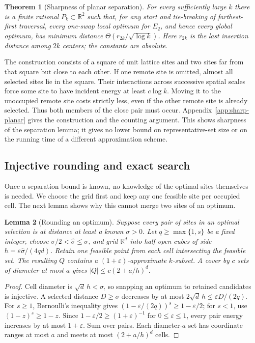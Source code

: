 \documentclass[a4paper,12pt]{article}
\newcommand{\R}{\mathbb R}
\newtheorem{theorem}{Theorem}[section]
\newtheorem{lemma}[theorem]{Lemma}
\numberwithin{equation}{section}
\begin{document}
\begin{theorem}[Sharpness of planar separation]\label{thm:sharp-planar}
For every sufficiently large $k$ there is a finite rational $P_k\subset\mathbb R^2$ such that,
for any start and tie-breaking of farthest-first traversal, every one-swap local optimum
for $E_2$, and hence every global optimum, has minimum distance
$\Theta(r_{2k}/\sqrt{\log k})$. Here $r_{2k}$ is the last insertion distance among $2k$ centers;
the constants are absolute.
\end{theorem}
The construction consists of a square of unit lattice sites and two sites far from that square
but close to each other. If one remote site is omitted, almost all selected sites lie in the
square. Their interactions across successive spatial scales force some site to have incident
energy at least $c\log k$. Moving it to the unoccupied remote site costs strictly less, even
if the other remote site is already selected. Thus both members of the close pair must occur.
Appendix~\ref{app:sharp-planar} gives the construction and the counting argument.
This shows sharpness of the separation lemma; it gives no lower bound on representative-set
size or on the running time of a different approximation scheme.

\subsection{Injective rounding and exact search}
Once a separation bound is known, no knowledge of the optimal sites themselves
is needed. We choose the grid first and keep any one feasible site per occupied
cell. The next lemma shows why this cannot merge two sites of an optimum.
\begin{lemma}[Rounding an optimum]\label{lem:rounding}
Suppose every pair of sites in an optimal selection is at distance at least a known $\sigma>0$. Let $q\ge\max\{1,s\}$
be a fixed integer, choose $\sigma/2<\widehat\sigma\le\sigma$, and grid $\R^d$ into half-open
cubes of side $h=\varepsilon\widehat\sigma/(4qd)$. Retain one feasible point from each cell
intersecting the feasible set. The resulting $Q$ contains a $(1+\varepsilon)$-approximate
$k$-subset. A cover by $c$ sets of diameter at most $a$ gives $|Q|\le c(2+a/h)^d$.
\end{lemma}
\begin{proof}
Cell diameter is $\sqrt d\,h<\sigma$, so snapping an optimum to retained candidates is injective.
A selected distance $D\ge\sigma$ decreases by at most $2\sqrt d\,h\le\varepsilon D/(2q)$. For
$s\ge1$, Bernoulli's inequality gives $(1-\varepsilon/(2q))^s\ge1-\varepsilon/2$; for $s<1$, use
$(1-z)^s\ge1-z$. Since $1-\varepsilon/2\ge(1+\varepsilon)^{-1}$ for $0\le\varepsilon\le1$, every
pair energy increases by at most $1+\varepsilon$. Sum over pairs. Each diameter-$a$ set has
coordinate ranges at most $a$ and meets at most $(2+a/h)^d$ cells.
\end{proof}
\end{document}
